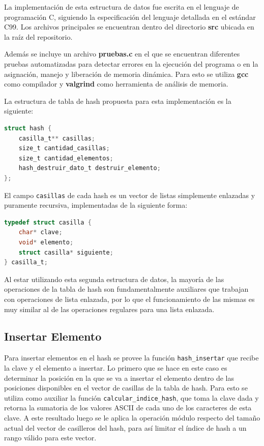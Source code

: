 \documentclass[titlepage,a4paper]{article}
\begin{document}
La implementación de esta estructura de datos fue escrita en el lenguaje de
programación C, siguiendo la especificación del lenguaje detallada en el
estándar C99. Los archivos principales se encuentran dentro del directorio
\textbf{src} ubicada en la raíz del repositorio. 

Además se incluye un archivo \textbf{pruebas.c} en el que se encuentran
diferentes pruebas automatizadas para detectar errores en la ejecución del
programa o en la asignación, manejo y liberación de memoria dinámica. Para esto
se utiliza \textbf{gcc} como compilador y \textbf{valgrind} como herramienta de
análisis de memoria.

La estructura de tabla de hash propuesta para esta implementación es la
siguiente:

\begin{lstlisting}[language=C]
struct hash {
	casilla_t** casillas;
	size_t cantidad_casillas;
	size_t cantidad_elementos;
	hash_destruir_dato_t destruir_elemento;
};
\end{lstlisting}

El campo \lstinline{casillas} de cada hash es un vector de listas simplemente enlazadas y puramente recursiva, implementadas de la siguiente forma:

\begin{lstlisting}[language=C]
typedef struct casilla {
	char* clave;
	void* elemento;
	struct casilla* siguiente;
} casilla_t;
\end{lstlisting}

Al estar utilizando esta segunda estructura de datos, la mayoría de las operaciones de la tabla de hash son fundamentalmente auxiliares que trabajan
con operaciones de lista enlazada, por lo que el funcionamiento de las mismas es muy similar al de las operaciones regulares para una lista enlazada.

                         \subsection{Insertar Elemento}

Para insertar elementos en el hash se provee la función
\lstinline{hash_insertar} que recibe la clave y el elemento a insertar. Lo
primero que se hace en este caso es determinar la posición en la que se va a
insertar el elemento dentro de las posiciones disponibles en el vector de
casillas de la tabla de hash. Para esto se utiliza como auxiliar la función
\lstinline{calcular_indice_hash}, que toma la clave dada y retorna la sumatoria
de los valores ASCII de cada uno de los caracteres de esta clave. A este
resultado luego se le aplica la operación módulo respecto del tamaño actual del
vector de casilleros del hash, para así limitar el índice de hash a un rango
válido para este vector.
\end{document}
